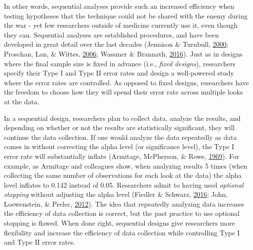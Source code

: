 \documentclass[
  english,
  ,jou, a4paper,floatsintext]{apa6}
\begin{document}
In other words, sequential analyses provide such an increased efficiency when testing hypotheses that the technique could not be shared with the enemy during the war - yet few researchers outside of medicine currently use it, even though they can. Sequential analyses are established procedures, and have been developed in great detail over the last decades (Jennison \& Turnbull, \protect\hyperlink{ref-jennison_group_2000}{2000}; Proschan, Lan, \& Wittes, \protect\hyperlink{ref-proschan_statistical_2006}{2006}; Wassmer \& Brannath, \protect\hyperlink{ref-wassmer_group_2016}{2016}). Just as in designs where the final sample size is fixed in advance (i.e., \emph{fixed designs}), researchers specify their Type I and Type II error rates and design a well-powered study where the error rates are controlled. As opposed to fixed designs, researchers have the freedom to choose how they will spend their error rate across multiple looks at the data.

In a sequential design, researchers plan to collect data, analyze the results, and depending on whether or not the results are statistically significant, they will continue the data collection. If one would analyze the data repeatedly as data comes in without correcting the alpha level (or significance level), the Type I error rate will substantially inflate (Armitage, McPherson, \& Rowe, \protect\hyperlink{ref-armitage_repeated_1969}{1969}). For example, as Armitage and colleagues show, when analyzing results 5 times (when collecting the same number of observations for each look at the data) the alpha level inflates to 0.142 instead of 0.05. Researchers admit to having used \emph{optional stopping} without adjusting the alpha level (Fiedler \& Schwarz, \protect\hyperlink{ref-fiedler_questionable_2016}{2016}; John, Loewenstein, \& Prelec, \protect\hyperlink{ref-john_measuring_2012}{2012}). The idea that repeatedly analyzing data increases the efficiency of data collection is correct, but the past practice to use optional stopping is flawed. When done right, sequential designs give researchers more flexibility and increase the efficiency of data collection while controlling Type I and Type II error rates.
\end{document}
